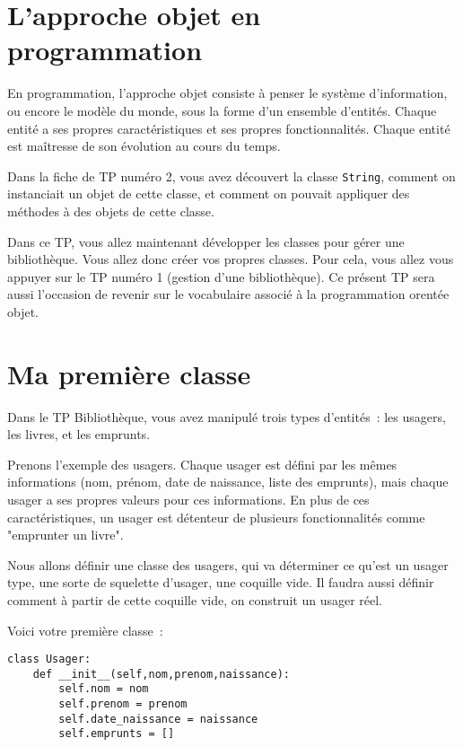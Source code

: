 \documentclass{article}
\begin{document}
\section{L'approche objet en programmation}

En programmation, l'approche objet consiste à penser le système d'information, ou encore le modèle du monde, sous la forme d'un ensemble d'entités. Chaque entité a ses propres caractéristiques et ses propres fonctionnalités. Chaque entité est maîtresse de son évolution au cours du temps.

Dans la fiche de TP numéro 2, vous avez découvert la classe \texttt{String}, comment on instanciait un objet de cette classe, et comment on pouvait appliquer des méthodes à des objets de cette classe.

Dans ce TP, vous allez maintenant développer les classes pour gérer une bibliothèque. Vous allez donc créer vos propres classes. Pour cela, vous allez vous appuyer sur le TP numéro 1 (gestion d'une bibliothèque). Ce présent TP sera aussi l'occasion de revenir sur le vocabulaire associé à la programmation orentée objet.


\section{Ma première classe}

Dans le TP Bibliothèque, vous avez manipulé trois types d'entités~: les usagers, les livres, et les emprunts.

Prenons l'exemple des usagers. Chaque usager est défini par les mêmes informations (nom, prénom, date de naissance, liste des emprunts), mais chaque usager a ses propres valeurs pour ces informations. En  plus de ces caractéristiques, un usager est détenteur de plusieurs fonctionnalités comme "emprunter un livre".

Nous allons définir une classe des usagers, qui va déterminer ce qu'est un usager type, une sorte de squelette d'usager, une coquille vide. Il faudra aussi définir comment à partir de cette coquille vide, on construit un usager réel.

Voici votre première classe~:

\begin{verbatim}
class Usager:
    def __init__(self,nom,prenom,naissance):
        self.nom = nom
        self.prenom = prenom
        self.date_naissance = naissance
        self.emprunts = []

\end{verbatim}  
\end{document}
